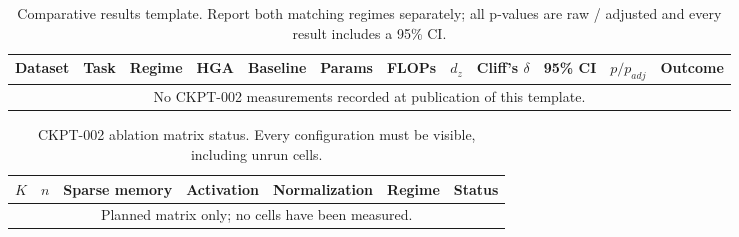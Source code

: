 \begin{table}[t]
\centering
\caption{Comparative results template. Report both matching regimes separately;
all p-values are raw / adjusted and every result includes a 95\% CI.}
\label{tab:ckpt002-comparison-template}
\begin{tabular}{llllllllllll}
\toprule
Dataset & Task & Regime & HGA & Baseline & Params & FLOPs & $d_z$ & Cliff's $\delta$ & 95\% CI & $p/p_{adj}$ & Outcome \\
\midrule
\multicolumn{12}{c}{No CKPT-002 measurements recorded at publication of this template.} \\
\bottomrule
\end{tabular}
\end{table}

\begin{table}[t]
\centering
\caption{CKPT-002 ablation matrix status. Every configuration must be visible,
including unrun cells.}
\label{tab:ckpt002-ablation-template}
\begin{tabular}{lllllll}
\toprule
$K$ & $n$ & Sparse memory & Activation & Normalization & Regime & Status \\
\midrule
\multicolumn{7}{c}{Planned matrix only; no cells have been measured.} \\
\bottomrule
\end{tabular}
\end{table}
